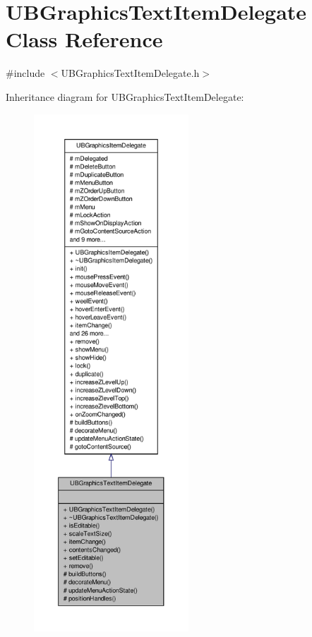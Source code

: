 \hypertarget{class_u_b_graphics_text_item_delegate}{\section{U\-B\-Graphics\-Text\-Item\-Delegate Class Reference}
\label{d9/dbd/class_u_b_graphics_text_item_delegate}
}


{\ttfamily \#include $<$U\-B\-Graphics\-Text\-Item\-Delegate.\-h$>$}



Inheritance diagram for U\-B\-Graphics\-Text\-Item\-Delegate\-:
\nopagebreak
\begin{figure}[H]
\begin{center}
\leavevmode
\includegraphics[height=550pt]{d4/de2/class_u_b_graphics_text_item_delegate__inherit__graph}
\end{center}
\end{figure}


